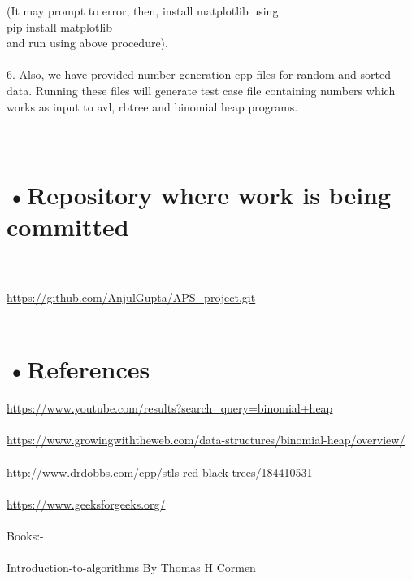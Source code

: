 (It may prompt to error, then, install matplotlib using \\
pip install matplotlib \\
and run using above procedure). \\ \\

6. Also, we have provided number generation cpp files for random and sorted data. Running these files will generate test case file containing numbers which works as input to avl, rbtree and binomial heap programs. \\ \\ \\
		
		
		\section*{•Repository where work is being committed} \\ \\
		\url{https://github.com/AnjulGupta/APS\_project.git} \\ \\
		
		\section*{•References}
		\url{https://www.youtube.com/results?search_query=binomial+heap} \\ \\
     \url{https://www.growingwiththeweb.com/data-structures/binomial-heap/overview/} \\ \\
	\url{http://www.drdobbs.com/cpp/stls-red-black-trees/184410531} \\ \\
	\url{https://www.geeksforgeeks.org/} \\ \\
 
Books:- \\ \\
	Introduction-to-algorithms By Thomas H Cormen

	
	


